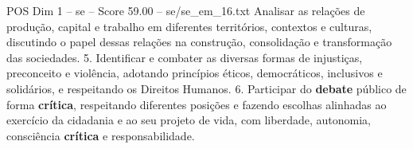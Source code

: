 \begin{textsample}{POS Dim 1 – se – Score 59.00 – se/se\_em\_16.txt}
Analisar as relações de produção, capital e trabalho em diferentes territórios, contextos e culturas, discutindo o papel dessas relações na construção, consolidação e transformação das sociedades. 5.
Identificar e combater as diversas formas de injustiças, preconceito e violência, adotando princípios éticos, democráticos, inclusivos e solidários, e respeitando os Direitos Humanos. 6.
Participar do \textbf{debate} público de forma \textbf{crítica}, respeitando diferentes posições e fazendo escolhas alinhadas ao exercício da cidadania e ao seu projeto de vida, com liberdade, autonomia, consciência \textbf{crítica} e responsabilidade.

\end{textsample}
